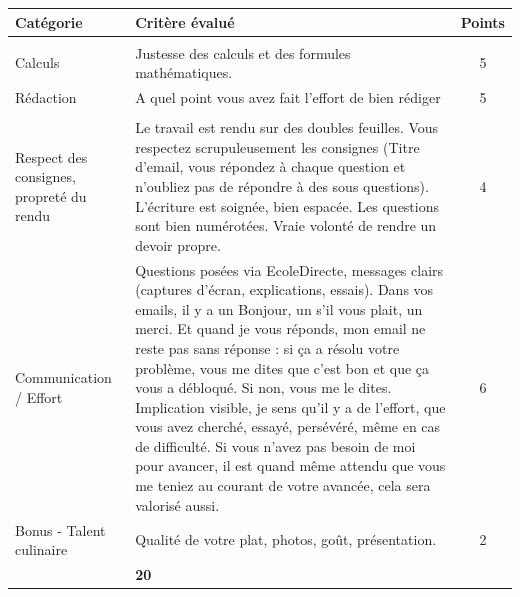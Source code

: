 \documentclass{exam}
\begin{document}
\centering
\begin{longtable}{|L{0.22\textwidth}|L{0.62\textwidth}|c|}
\hline
{}
\textbf{Catégorie} & \textbf{Critère évalué} & \textbf{Points} \\[2pt]
\hline

 \\
\hline

Calculs
& Justesse des calculs et des formules mathématiques.
& 5 \\
\hline

Rédaction
& A quel point vous avez fait l'effort de bien rédiger
& 5 \\
\hline

 \\
\hline

Respect des consignes, propreté du rendu
& Le travail est rendu sur des doubles feuilles. Vous respectez scrupuleusement les consignes (Titre d'email, vous répondez à chaque question et n'oubliez pas de répondre à des sous questions). L'écriture est soignée, bien espacée. Les questions sont bien numérotées. Vraie volonté de rendre un devoir propre.
& 4 \\
\hline

Communication / Effort
& Questions posées via EcoleDirecte, messages clairs (captures d'écran, explications, essais). Dans vos emails, il y a un Bonjour, un s'il vous plait, un merci. Et quand je vous réponds, mon email ne reste pas sans réponse : si ça a résolu votre problème, vous me dites que c'est bon et que ça vous a débloqué. Si non, vous me le dites.  Implication visible, je sens qu'il y a de l'effort, que vous avez cherché, essayé, persévéré, même en cas de difficulté. Si vous n'avez pas besoin de moi pour avancer, il est quand même attendu que vous me teniez au courant de votre avancée, cela sera valorisé aussi.
& 6 \\
\hline

Bonus - Talent culinaire
& Qualité de votre plat, photos, goût, présentation.
& 2 \\
\hline

 & \textbf{20} \\
\hline

\end{longtable}
\end{document}
